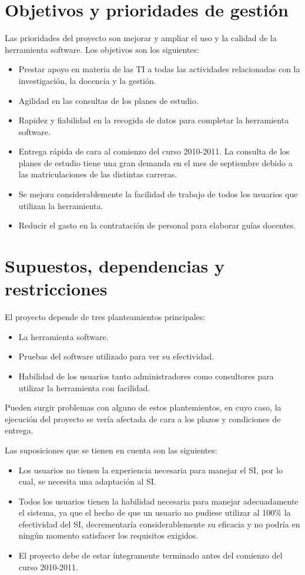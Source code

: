 \documentclass[11pt,a4paper,spanish,twoside]{report}
\begin{document}
\section{Objetivos y prioridades de gestión}
Las prioridades del proyecto son mejorar y ampliar el uso y la calidad de la
herramienta software. Los objetivos son los siguientes:
\begin{itemize}
\item Prestar apoyo en materia de las TI a todas las actividades relacionadas
  con la investigación, la docencia y la gestión.
\item Agilidad en las consultas de los planes de estudio.
\item Rapidez y fiabilidad en la recogida de datos para completar la
  herramienta software.
\item Entrega rápida de cara al comienzo del curso 2010-2011. La consulta de
  los planes de estudio tiene una gran demanda en el mes de septiembre debido
  a las matriculaciones de las distintas carreras.
\item Se mejora considerablemente la facilidad de trabajo de todos los
  usuarios que utilizan la herramienta.
\item Reducir el gasto en la contratación de personal para elaborar guías
  docentes. 
\end{itemize}

\section{Supuestos, dependencias y restricciones}
El proyecto depende de tres planteamientos principales:
\begin{itemize}
\item La herramienta software.
\item Pruebas del software utilizado para ver su efectividad.
\item Habilidad de los usuarios tanto administradores como consultores para
  utilizar la herramienta con facilidad.
\end{itemize}
Pueden surgir problemas con alguno de estos plantemientos, en cuyo caso, la
ejecución del proyecto se vería afectada de cara a los plazos y condiciones
de entrega.

Las suposiciones que se tienen en cuenta son las siguientes:
\begin{itemize}
\item Los usuarios no tienen la experiencia necesaria para manejar el SI, por
  lo cual, se necesita una adaptación al SI. 
\item Todos los usuarios tienen la habilidad necesaria para manejar
  adecuadamente el sistema, ya que el hecho de que un usuario no pudiese
  utilizar al 100\% la efectividad del SI, decrementaría considerablemente su
  eficacia y no podría en ningún momento satisfacer los requisitos exigidos.
\item El proyecto debe de estar íntegramente terminado antes del comienzo del
  curso 2010-2011.
\end{itemize}
\end{document}
